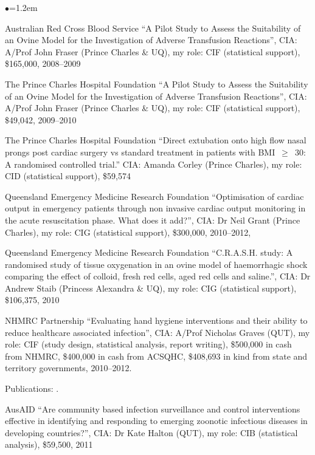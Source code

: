\documentclass[a4paper,11pt]{article}
\renewcommand{\labelitemi}{$\bullet$}
\begin{document}
\begin{raggedright}
\begin{list}{\labelitemi}{\leftmargin=1.2em}
\item Australian Red Cross Blood Service ``A Pilot Study to Assess the Suitability of an Ovine Model for the Investigation of Adverse Transfusion Reactions'', CIA: A/Prof John Fraser (Prince Charles \& UQ), my role: CIF (statistical support), \$165,000, 2008--2009

\item The Prince Charles Hospital Foundation ``A Pilot Study to Assess the Suitability of an Ovine Model for the Investigation of Adverse Transfusion Reactions'', CIA: A/Prof John Fraser (Prince Charles \& UQ), my role: CIF (statistical support), \$49,042, 2009--2010

\item The Prince Charles Hospital Foundation ``Direct extubation onto high flow nasal prongs post cardiac surgery vs standard treatment in patients with BMI~$\geq$~30: A randomised controlled trial.''  CIA: Amanda Corley (Prince Charles), my role: CID (statistical support), \$59,574

\item Queensland Emergency Medicine Research Foundation ``Optimisation of cardiac output in emergency patients through non invasive cardiac output monitoring in the acute resuscitation phase. What does it add?'', CIA: Dr Neil Grant (Prince Charles), my role: CIG (statistical support), \$300,000, 2010--2012,

\item Queensland Emergency Medicine Research Foundation ``C.R.A.S.H. study: A randomised study of tissue oxygenation in an ovine model of haemorrhagic shock comparing the effect of colloid, fresh red cells, aged red cells and saline.'', CIA: Dr Andrew Staib (Princess Alexandra \& UQ), my role: CIG (statistical support), \$106,375, 2010

\item NHMRC Partnership ``Evaluating hand hygiene interventions and their ability to reduce healthcare associated infection'', CIA: A/Prof Nicholas Graves (QUT), my role: CIF (study design, statistical analysis, report writing), \$500,000 in cash from NHMRC, \$400,000 in cash from ACSQHC, \$408,693 in kind from state and territory governments, 2010--2012.

    Publications: .

\item AusAID ``Are community based infection surveillance and control interventions effective in identifying and responding to emerging zoonotic infectious diseases in developing countries?'', CIA: Dr Kate Halton (QUT), my role: CIB (statistical analysis), \$59,500, 2011


\end{list}
\end{raggedright}
\end{document}
